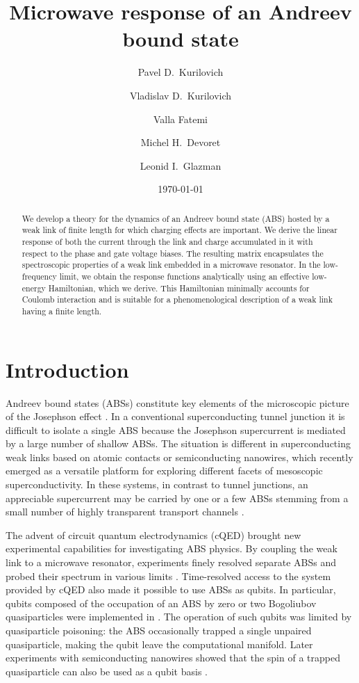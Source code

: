\documentclass[aps,reprint,longbibliography, prb]{revtex4-2}
\begin{document}
\title{Microwave response of an Andreev bound state}
\author{Pavel D.~Kurilovich}
\author{Vladislav D.~Kurilovich}
\author{Valla Fatemi}
\author{Michel H.~Devoret}
\author{Leonid I.~Glazman}

\date{\today}
\begin{abstract}
We develop a theory for the dynamics of an Andreev bound state (ABS) hosted by a weak link of finite length for which charging effects are important. We derive the linear response of both the current through the link and charge accumulated in it with respect to the phase and gate voltage biases. The resulting matrix encapsulates the spectroscopic properties of a weak link embedded in a microwave resonator. In the low-frequency limit, we obtain the response functions analytically using an effective low-energy Hamiltonian, which we derive. This Hamiltonian minimally accounts for Coulomb interaction and is suitable for a phenomenological description of a weak link having a finite length.
\end{abstract}

\maketitle
\section{Introduction}
Andreev bound states (ABSs) constitute key elements of the microscopic picture of the Josephson effect \cite{houten1991, beenakker1991, furusaki1991}. In a conventional superconducting tunnel junction it is difficult to isolate a single ABS because the Josephson supercurrent is mediated by a large number of shallow ABSs. The situation is different in superconducting weak links based on atomic contacts or  semiconducting nanowires, which recently emerged as a versatile platform for exploring different facets of mesoscopic superconductivity.
In these systems, in contrast to tunnel junctions,  an appreciable supercurrent may be carried by one or a few ABSs stemming from a small number of highly transparent transport channels \cite{bretheau2013, woerkom2017, krogstrup2017, marcus2017}.

The advent of circuit quantum electrodynamics (cQED) brought new experimental capabilities for investigating ABS physics. By coupling the weak link to a microwave resonator, experiments finely resolved separate ABSs and probed their spectrum in various limits \cite{janvier2015, delange2015, hays2018, tosi2019, hays2020, metzger2021}. Time-resolved access to the system provided by cQED also made it possible to use ABSs as qubits. In particular, qubits composed of the occupation of an ABS by zero or two Bogoliubov quasiparticles were implemented in \cite{janvier2015, hays2018}. The operation of such qubits was limited by quasiparticle poisoning: the ABS occasionally trapped a single unpaired quasiparticle, making the qubit leave the computational manifold. Later experiments with semiconducting nanowires showed that the spin of a trapped quasiparticle can also be used as a qubit basis \cite{hays2020,hays2021}.
\end{document}
